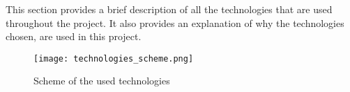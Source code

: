 This section provides a brief description of all the technologies that are used throughout the project. It also provides an explanation of why the technologies chosen, are used in this project.

\begin{figure}[!h]
  \centering
  \texttt{[image: technologies\_scheme.png]}
  \caption{Scheme of the used technologies}
  \label{fig:technologies}
\end{figure}